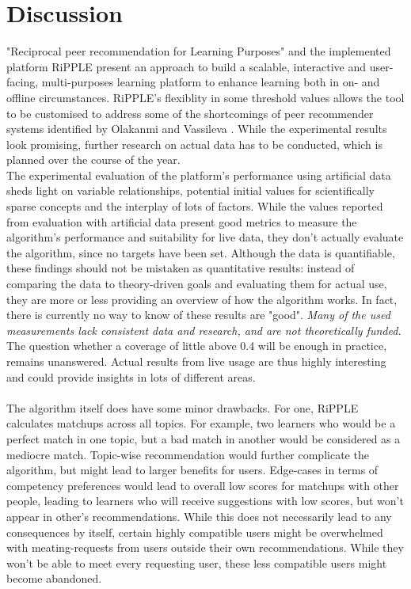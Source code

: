 \documentclass[nochapterpage,bigchapter,linedtoc,longdoc,colorback,accentcolor=tud3b,oneside]{tudreport}
\begin{document}
\section{Discussion} \label{paper:discussion}
"Reciprocal peer recommendation for Learning Purposes" and the implemented platform RiPPLE present an approach to build a scalable, interactive and user-facing, multi-purposes learning platform to enhance learning both in on- and offline circumstances. RiPPLE's flexiblity in some threshold values allows the tool to be customised to address some of the shortcomings of peer recommender systems identified by Olakanmi and Vassileva \cite{olakanmi2017group}. While the experimental results look promising, further research on actual data has to be conducted, which is planned over the course of the year.\\
The experimental evaluation of the platform's performance using artificial data sheds light on variable relationships, potential initial values for scientifically sparse concepts and the interplay of lots of factors. While the values reported from evaluation with artificial data present good metrics to measure the algorithm's performance and suitability for live data, they don't actually evaluate the algorithm, since no targets have been set. Although the data is quantifiable, these findings should not be mistaken as quantitative results: instead of comparing the data to theory-driven goals and evaluating them for actual use, they are more or less providing an overview of how the algorithm works. In fact, there is currently no way to know of these results are "good". \textit{Many of the used measurements lack consistent data and research, and are not theoretically funded.} The question whether a coverage of little above 0.4 will be enough in practice, remains unanswered. Actual results from live usage are thus highly interesting and could provide insights in lots of different areas.\\
\\
The algorithm itself does have some minor drawbacks. For one, RiPPLE calculates matchups across all topics. For example, two learners who would be a perfect match in one topic, but a bad match in another would be considered as a mediocre match. Topic-wise recommendation would further complicate the algorithm, but might lead to larger benefits for users. Edge-cases in terms of competency preferences would lead to overall low scores for matchups with other people, leading to learners who will receive suggestions with low scores, but won't appear in other's recommendations. While this does not necessarily lead to any consequences by itself, certain highly compatible users might be overwhelmed with meating-requests from users outside their own recommendations. While they won't be able to meet every requesting user, these less compatible users might become abandoned.\\
\end{document}
